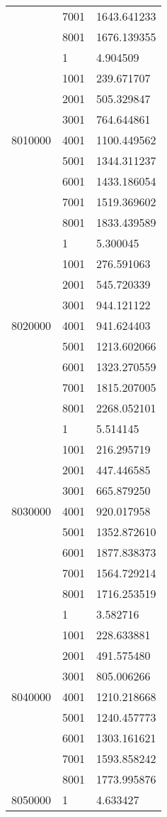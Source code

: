 \begin{table}[htb!]
\begin{tabular}{lll}
 & 7001 & 1643.641233 \\
 & 8001 & 1676.139355 \\
\multirow[c]{9}{*}{8010000} & 1 & 4.904509 \\
 & 1001 & 239.671707 \\
 & 2001 & 505.329847 \\
 & 3001 & 764.644861 \\
 & 4001 & 1100.449562 \\
 & 5001 & 1344.311237 \\
 & 6001 & 1433.186054 \\
 & 7001 & 1519.369602 \\
 & 8001 & 1833.439589 \\
\multirow[c]{9}{*}{8020000} & 1 & 5.300045 \\
 & 1001 & 276.591063 \\
 & 2001 & 545.720339 \\
 & 3001 & 944.121122 \\
 & 4001 & 941.624403 \\
 & 5001 & 1213.602066 \\
 & 6001 & 1323.270559 \\
 & 7001 & 1815.207005 \\
 & 8001 & 2268.052101 \\
\multirow[c]{9}{*}{8030000} & 1 & 5.514145 \\
 & 1001 & 216.295719 \\
 & 2001 & 447.446585 \\
 & 3001 & 665.879250 \\
 & 4001 & 920.017958 \\
 & 5001 & 1352.872610 \\
 & 6001 & 1877.838373 \\
 & 7001 & 1564.729214 \\
 & 8001 & 1716.253519 \\
\multirow[c]{9}{*}{8040000} & 1 & 3.582716 \\
 & 1001 & 228.633881 \\
 & 2001 & 491.575480 \\
 & 3001 & 805.006266 \\
 & 4001 & 1210.218668 \\
 & 5001 & 1240.457773 \\
 & 6001 & 1303.161621 \\
 & 7001 & 1593.858242 \\
 & 8001 & 1773.995876 \\
\multirow[c]{9}{*}{8050000} & 1 & 4.633427 \\

\end{tabular}
\end{table}

